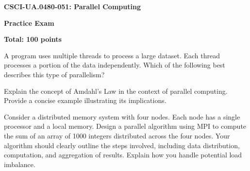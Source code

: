 \documentclass[12pt]{article}
\begin{document}
\begin{center}
{\large\bfseries CSCI-UA.0480-051: Parallel Computing}

\vspace{0.2cm}

{\normalsize\bfseries Practice Exam}

\vspace{0.1cm}

{\normalsize\bfseries Total: 100 points}
\end{center}

\vspace{0.4cm}

A program uses multiple threads to process a large dataset.  Each thread processes a portion of the data independently. Which of the following best describes this type of parallelism?


\vspace{0.3cm}
Explain the concept of Amdahl's Law in the context of parallel computing.  Provide a concise example illustrating its implications.


\vspace{0.3cm}
Consider a distributed memory system with four nodes.  Each node has a single processor and a local memory.  Design a parallel algorithm using MPI to compute the sum of an array of 1000 integers distributed across the four nodes.  Your algorithm should clearly outline the steps involved, including data distribution, computation, and aggregation of results.  Explain how you handle potential load imbalance.
\end{document}
